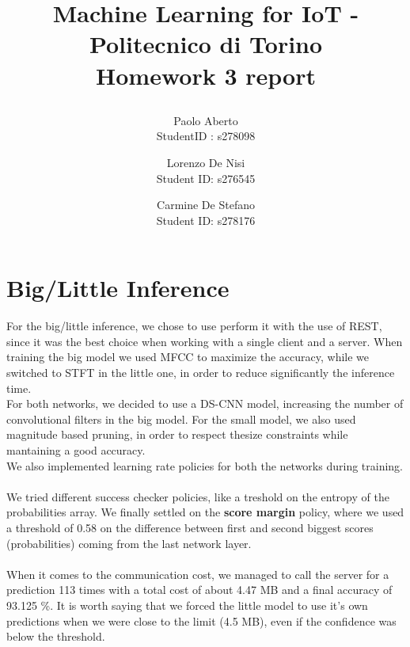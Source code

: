 \documentclass{article}
\date{}
\begin{document}
\author{Paolo Aberto\\
StudentID : s278098\\

\and
Lorenzo De Nisi\\
Student ID: s276545\\

\and
Carmine De Stefano\\
Student ID: s278176\\
}

\justifying

\title{
    \vspace{0.4cm}
    
    Machine Learning for IoT - 
    Politecnico di Torino\\
    \vspace{.5cm}
    \Large \textbf{Homework 3 report}
    \vspace{.1cm}
}

\maketitle
\thispagestyle{empty} 
\vspace{-0.9cm}


\section{Big/Little Inference}
For the big/little inference, we chose to use perform it with the use of REST, since it was the best choice when working with a single client and a server.
When training the big model we used MFCC to maximize the accuracy, while we switched to STFT in the little one, in order to reduce significantly the inference time.
\\
For both networks, we decided to use a DS-CNN model, increasing the number of convolutional filters in the big model. For the small model, we also used magnitude based pruning, in order to respect thesize constraints while mantaining a good accuracy.\\
We also implemented learning rate policies for both the networks during training.\\\\
We tried different success checker policies, like a treshold on the entropy of the probabilities array. We finally settled on the \textbf{score margin} policy, where we used a threshold of 0.58 on the difference between first and second biggest scores (probabilities) coming from the last network layer.
\\\\
When it comes to the communication cost, we managed to call the server for a prediction 113 times with a total cost of about 4.47 MB and a final accuracy of 93.125 \%.
It is worth saying that we forced the little model to use it's own predictions when we were close to the limit (4.5 MB), even if the confidence was below the threshold. 
\end{document}
